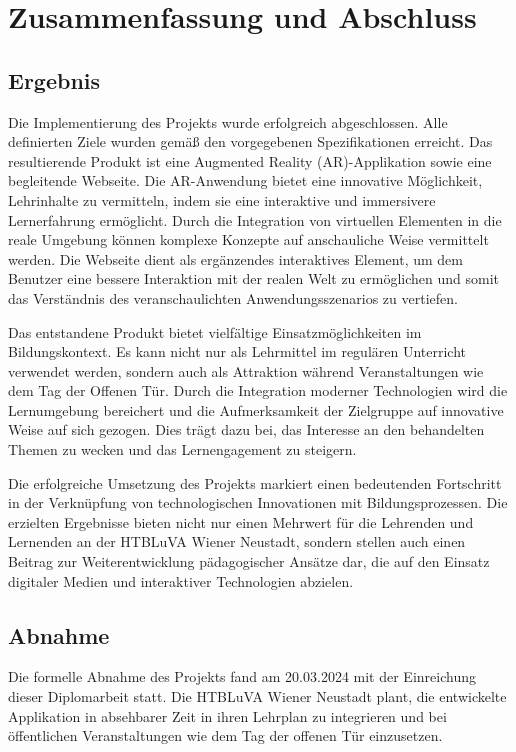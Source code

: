 \chapter{Zusammenfassung und Abschluss}

\section{Ergebnis}
Die Implementierung des Projekts wurde erfolgreich abgeschlossen. Alle definierten Ziele wurden gemäß den vorgegebenen
Spezifikationen erreicht. Das resultierende Produkt ist eine Augmented Reality (AR)-Applikation sowie eine begleitende
Webseite. Die AR-Anwendung bietet eine innovative Möglichkeit, Lehrinhalte zu vermitteln, indem sie eine interaktive und
immersivere Lernerfahrung ermöglicht. Durch die Integration von virtuellen Elementen in die reale Umgebung können komplexe
Konzepte auf anschauliche Weise vermittelt werden. Die Webseite dient als ergänzendes interaktives Element, um dem Benutzer
eine bessere Interaktion mit der realen Welt zu ermöglichen und somit das Verständnis des veranschaulichten Anwendungsszenarios
zu vertiefen.

Das entstandene Produkt bietet vielfältige Einsatzmöglichkeiten im Bildungskontext. Es kann nicht nur als Lehrmittel im
regulären Unterricht verwendet werden, sondern auch als Attraktion während Veranstaltungen wie dem Tag der Offenen Tür.
Durch die Integration moderner Technologien wird die Lernumgebung bereichert und die Aufmerksamkeit der Zielgruppe auf
innovative Weise auf sich gezogen. Dies trägt dazu bei, das Interesse an den behandelten Themen zu wecken und das Lernengagement
zu steigern.

Die erfolgreiche Umsetzung des Projekts markiert einen bedeutenden Fortschritt in der Verknüpfung von technologischen
Innovationen mit Bildungsprozessen. Die erzielten Ergebnisse bieten nicht nur einen Mehrwert für die Lehrenden und Lernenden
an der HTBLuVA Wiener Neustadt, sondern stellen auch einen Beitrag zur Weiterentwicklung pädagogischer Ansätze dar, die
auf den Einsatz digitaler Medien und interaktiver Technologien abzielen.

\section{Abnahme}
Die formelle Abnahme des Projekts fand am 20.03.2024 mit der Einreichung dieser Diplomarbeit statt. Die HTBLuVA Wiener
Neustadt plant, die entwickelte Applikation in absehbarer Zeit in ihren Lehrplan zu integrieren und bei öffentlichen
Veranstaltungen wie dem Tag der offenen Tür einzusetzen.

